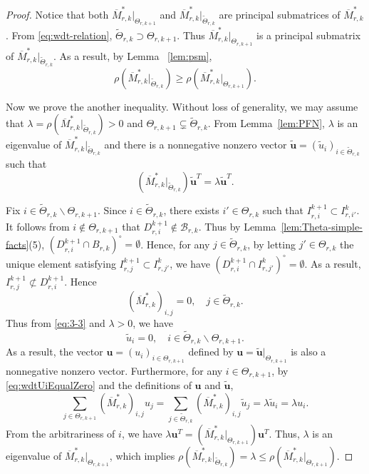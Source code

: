 \documentclass[11pt]{amsart}
\theoremstyle{definition}
\theoremstyle{remark}
\numberwithin{equation}{section}
\newcommand{\bfu}{{\mathbf u}}
\newcommand{\mB}{{\mathcal B}}
\newcommand{\upM}{{\overline{M}}}
\def\wdt{\widetilde}
\begin{document}
\begin{proof}
	
	Notice that both $\upM_{r,k}^*|_{\Theta_{r,k+1}}$ and $\upM_{r,k}^*|_{\wdt {\Theta}_{r,k}}$ are principal submatrices of $\upM_{r,k}^*$. From \eqref{eq:wdt-relation}, $\wdt{\Theta}_{r,k} \supset {\Theta}_{r,k+1}$. Thus
	$\upM_{r,k}^*|_{\Theta_{r,k+1}}$ is a principal submatrix of $\upM_{r,k}^*|_{\wdt {\Theta}_{r,k}}$.
	As a result, by Lemma ~\ref{lem:psm},
	$$
	\rho(\upM_{r,k}^*|_{\wdt{\Theta}_{r,k}}) \geq \rho(\upM_{r,k}^*|_{\Theta_{r,k+1}}).	
	$$
	
	Now we prove the another inequality. 
	Without loss of generality, we may assume that $\lambda=\rho(\upM_{r,k}^*|_{\wdt{\Theta}_{r,k}} )>0$ and ${\Theta}_{r,k+1} \subsetneq \wdt{\Theta}_{r,k}$.
	From Lemma~\ref{lem:PFN}, 
	$\lambda$ is an eigenvalue of $\upM_{r,k}^* |_{\wdt{\Theta}_{r,k}}$ and there is a nonnegative nonzero vector 
	$ \wdt\bfu=(\wdt{u}_{i})_{i\in {\wdt{\Theta}_{r,k}}}$ such that
	\begin{equation}\label{eq:3-3}
	  (\upM_{r,k}^* |_{\wdt{\Theta}_{r,k}}) \wdt\bfu^T =\lambda \wdt\bfu^T.		
	\end{equation}
	


	Fix $i \in \wdt{\Theta}_{r,k} \backslash {\Theta}_{r,k+1}$. Since $i \in \wdt{\Theta}_{r,k}$, there exists $i' \in \Theta_{r,k}$ such that $I_{r,i}^{k+1}\subset I_{r,i'}^k$. It follows from $i\not\in {\Theta}_{r,k+1}$ that $D_{r,i}^{k+1}\not\in \mB_{r,k}$. Thus by Lemma~\ref{lem:Theta-simple-facts}(5), $(D_{r,i}^{k+1}\cap B_{r,k})^\circ=\emptyset$.
	Hence, for any $j \in \wdt{\Theta}_{r,k}$, by letting $j' \in \Theta_{r,k}$ the unique element satisfying $I_{r,j}^{k+1}\subset I_{r,j'}^k$, we have %
	$(D_{r,i}^{k+1}\cap I_{r,j'}^k )^\circ=\emptyset$. As a result, 
	$
	I_{r,j}^{k+1}  \not \subset D_{r,i}^{k+1}.
	$
	Hence
	\begin{equation*}%
		(\upM_{r,k}^*)_{i,j}=0 ,\quad  j \in \wdt{\Theta}_{r,k}.
	\end{equation*}
	Thus from \eqref{eq:3-3} and $\lambda>0$, 
	we have 
	\begin{equation}\label{eq:wdtUiEqualZero}
	    \wdt{u}_{i}=0, \quad  i \in \wdt{\Theta}_{r,k} \backslash {\Theta}_{r,k+1}. 
    \end{equation}
    As a result, the vector $\bfu=(u_i)_{i \in \Theta_{r,k+1}}$ defined by $\bfu=\wdt{\bfu}|_{\Theta_{r,k+1}}$ is also a nonnegative nonzero vector.
	Furthermore, for any $i \in \Theta_{r,k+1}$, by \eqref{eq:wdtUiEqualZero} and the definitions of $\bfu$ and $\wdt\bfu$,
	\[
	   \sum_{j \in {\Theta}_{r,k+1}} (\upM_{r,k}^* )_{i,j} {u}_{j}
	   =\sum_{j \in \wdt{\Theta}_{r,k}} (\upM_{r,k}^* )_{i,j}\wdt{u}_{j}
	   =\lambda \wdt{u}_{i}=\lambda u_{i}. 
	\]
	From the arbitrariness of $i$, we have $\lambda \bfu^T=(\upM_{r,k}^* |_{\Theta_{r,k+1}}) \bfu^T$.
	Thus, $\lambda$ is an eigenvalue of $\upM_{r,k}^*|_{\Theta_{r,k+1}} $, which implies $\rho(\upM_{r,k}^* |_{\wdt{\Theta}_{r,k}})=\lambda \leq \rho(\upM_{r,k}^*|_{\Theta_{r,k+1}})$.
\end{proof}
\end{document}
